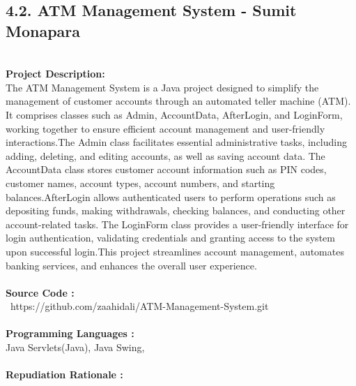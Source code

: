 \documentclass[12pt,letterpaper]{report}
\begin{document}
\subsection*{4.2. ATM Management System - Sumit Monapara} \\
\normalsize {\textbf{Project Description:}} \\
\normalsize {The ATM Management System is a Java project designed to simplify the management of customer accounts through an automated teller machine (ATM). It comprises classes such as Admin, AccountData, AfterLogin, and LoginForm, working together to ensure efficient account management and user-friendly interactions.The Admin class facilitates essential administrative tasks, including adding, deleting, and editing accounts, as well as saving account data. The AccountData class stores customer account information such as PIN codes, customer names, account types, account numbers, and starting balances.AfterLogin allows authenticated users to perform operations such as depositing funds, making withdrawals, checking balances, and conducting other account-related tasks. The LoginForm class provides a user-friendly interface for login authentication, validating credentials and granting access to the system upon successful login.This project streamlines account management, automates banking services, and enhances the overall user experience.}\\
\\
\normalsize{\textbf{Source Code :}} \\
\normalsize{\  https://github.com/zaahidali/ATM-Management-System.git }\\
\\
\normalsize{\textbf{Programming Languages :}}\\
\normalsize{Java Servlets(Java), Java Swing,  }\\
\\
\normalsize{\textbf{Repudiation Rationale : }}\\
\end{document}
